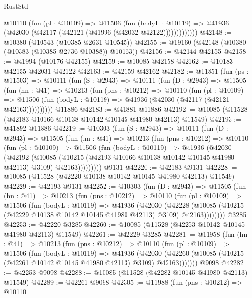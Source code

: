 \begin{lexlean}{RustStd}
\begin{coremodule}
              @10110
                (fun (pl : @10109) =>
                @11506
                  (fun (bodyL : @10119) =>
                  @41936 (@42030 (@42117 (@42121 (@41996 (@42032 @42122)))))))))))))
@42148 := @10380 (@10543 (@10385 @2631 @10545))
@42155 := @19160 (@42148 (@10380 (@10383 (@10385 @2736 @10388)) @10163))
@42156 := @42144 @42155
@42158 := @41994 (@10176 @42155)
@42159 := @10085 @42158
@42162 := @10183 @42155 @42031 @42122
@42163 := @42159 @42162
@42182 := @11851
    (fun (ps : @11503) =>
    @10111
      (fun (S : @2943) =>
      @10111
        (fun (D : @2943) =>
        @11505
          (fun (hn : @41) =>
          @10213
            (fun (pns : @10212) =>
            @10110
              (fun (pl : @10109) =>
              @11506 (fun (bodyL : @10119) => @41936 (@42030 (@42117 (@42121 @42163))))))))))
    @11886
@42183 := @41881 @11886
@42192 := @10085 (@11528 (@42183 @10166 @10138 @10142 @10145 @41980 @42113) @11549)
@42193 := @41892 @11886
@42219 := @10303
    (fun (S : @2943) =>
    @10111
      (fun (D : @2943) =>
      @11505
        (fun (hn : @41) =>
        @10213
          (fun (pns : @10212) =>
          @10110
            (fun (pl : @10109) =>
            @11506
              (fun (bodyL : @10119) =>
              @41936
                (@42030
                  (@42192
                    (@10085
                      (@10215 (@42193 @10166 @10138 @10142 @10145 @41980 @42113) @3109)
                      @42163)))))))))
    @9131
@42220 := @42183 @9131
@42228 := @10085 (@11528 (@42220 @10138 @10142 @10145 @41980 @42113) @11549)
@42229 := @42193 @9131
@42252 := @10303
    (fun (D : @2943) =>
    @11505
      (fun (hn : @41) =>
      @10213
        (fun (pns : @10212) =>
        @10110
          (fun (pl : @10109) =>
          @11506
            (fun (bodyL : @10119) =>
            @41936
              (@42030
                (@42228
                  (@10085 (@10215 (@42229 @10138 @10142 @10145 @41980 @42113) @3109) @42163))))))))
    @3285
@42253 := @42220 @3285
@42260 := @10085 (@11528 (@42253 @10142 @10145 @41980 @42113) @11549)
@42261 := @42229 @3285
@42281 := @11958
    (fun (hn : @41) =>
    @10213
      (fun (pns : @10212) =>
      @10110
        (fun (pl : @10109) =>
        @11506
          (fun (bodyL : @10119) =>
          @41936
            (@42030
              (@42260 (@10085 (@10215 (@42261 @10142 @10145 @41980 @42113) @3109) @42163)))))))
    @9098
@42282 := @42253 @9098
@42288 := @10085 (@11528 (@42282 @10145 @41980 @42113) @11549)
@42289 := @42261 @9098
@42305 := @11988
    (fun (pns : @10212) =>
    @10110

\end{coremodule}
\end{lexlean}
